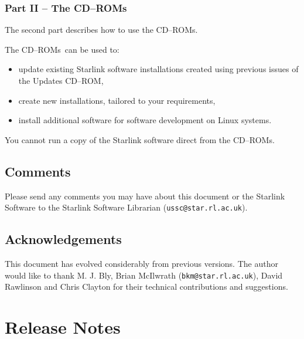 \documentclass[twoside,11pt]{article}
\newcommand{\htmladdnormallink}[2]{#1}
\newcommand{\xlabel}[1]{}
\renewcommand{\_}{\texttt{\symbol{95}}}
\newcommand{\cdrom}{CD--ROM}
\newcommand{\cdrom}{CD-ROM}
\newcommand{\cdroms}{CD--ROMs}
\newcommand{\cdroms}{CD-ROMs}
\begin{document}

\subsubsection{Part II -- The \cdroms}

The second part describes how to use the \cdroms.

The \cdroms\ can be used to:

\begin{itemize}
\item update existing Starlink software installations created using previous
issues of the Updates \cdrom,
\item create new installations, tailored to your requirements,
\item install additional software for software development on Linux systems.
\end{itemize}

You cannot run a copy of the Starlink software direct from the \cdroms.


\subsection{\xlabel{comments}Comments}
\label{comments}

Please send any comments you may have about this document or the Starlink
Software to the Starlink Software Librarian 
(\htmladdnormallink{\texttt{ussc@star.rl.ac.uk}}{mailto:ussc@star.rl.ac.uk}).

\subsection{\xlabel{acknowledgments}\label{acknowledgements}Acknowledgements}

This document has evolved considerably from previous versions.  The author 
would like to thank M. J. Bly, Brian McIlwrath (\texttt{bkm@star.rl.ac.uk}), David 
Rawlinson and Chris Clayton for their technical contributions and suggestions.


\newpage
\section{\xlabel{Release Notes}Release Notes}
\label{Release_Notes}
\end{document}
